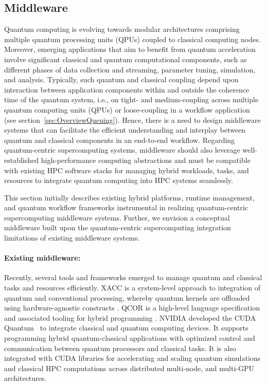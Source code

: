 \subsection{Middleware}

Quantum computing is evolving towards modular architectures comprising multiple quantum processing units (QPUs) coupled to classical computing nodes. Moreover, emerging applications that aim to benefit from quantum acceleration involve significant classical and quantum computational components, such as different phases of data collection and streaming, parameter tuning, simulation, and analysis. Typically, such quantum and classical coupling depend upon interaction between application components within and outside the coherence time of the quantum system, i.e., on tight- and medium-coupling across multiple quantum computing units (QPUs) or loose-coupling in a workflow application~\cite{saurabh2023conceptual} (see section~\ref{sec:OverviewQueuing}). Hence, there is a need to design middleware systems that can facilitate the efficient understanding and interplay between quantum and classical components in an end-to-end workflow. Regarding quantum-centric supercomputing systems, middleware should also leverage well-established high-performance computing abstractions and must be compatible with existing HPC software stacks for managing hybrid workloads, tasks, and resources to integrate quantum computing into HPC systems seamlessly. 

This section initially describes existing hybrid platforms, runtime management, and quantum workflow frameworks instrumental in realizing quantum-centric supercomputing middleware systems. Further, we envision a conceptual middleware built upon the quantum-centric supercomputing integration limitations of existing middleware systems. 

\paragraph{\bf Existing middleware:} Recently, several tools and frameworks emerged to manage quantum and classical tasks and resources efficiently. XACC is a system-level approach to integration of quantum and conventional processing, whereby  quantum kernels are offloaded using hardware-agnostic constructs \cite{McCaskey_2020}. QCOR is a high-level language specification and associated tooling for hybrid programming \cite{10.1145/3380964,10.1145/3462670}.  NVIDIA developed the CUDA Quantum~\cite{cuda_quantum} to integrate classical and quantum computing devices. It supports programming hybrid quantum-classical applications with optimized control and communication between quantum processors and classical tasks.  It is also integrated with CUDA libraries for accelerating and scaling quantum simulations and classical HPC computations across distributed multi-node, and multi-GPU architectures. 

